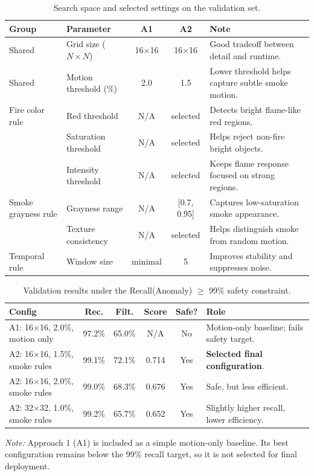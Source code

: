 \documentclass[10pt,a4paper]{article}
\begin{document}
	\begin{table}[ht]
		\centering
		\caption{Search space and selected settings on the validation set.}
		\label{tab:hyperparam_search}
		\scriptsize
		\setlength{\tabcolsep}{4pt}
		\begin{tabularx}{\columnwidth}{l l c c X}
			\toprule
			\textbf{Group} & \textbf{Parameter} & \textbf{A1} & \textbf{A2} & \textbf{Note} \\
			\midrule
			Shared & Grid size ($N \times N$) & 16$\times$16 & 16$\times$16 & Good tradeoff between detail and runtime. \\
			Shared & Motion threshold (\%) & 2.0 & 1.5 & Lower threshold helps capture subtle smoke motion. \\
			\midrule
			Fire color rule & Red threshold & N/A & selected & Detects bright flame-like red regions. \\
			& Saturation threshold & N/A & selected & Helps reject non-fire bright objects. \\
			& Intensity threshold & N/A & selected & Keeps flame response focused on strong regions. \\
			\midrule
			Smoke grayness rule & Grayness range & N/A & [0.7, 0.95] & Captures low-saturation smoke appearance. \\
			& Texture consistency & N/A & selected & Helps distinguish smoke from random motion. \\
			\midrule
			Temporal rule & Window size & minimal & 5 & Improves stability and suppresses noise. \\
			\bottomrule
		\end{tabularx}
	\end{table}


	\begin{table}[ht]
		\centering
		\caption{Validation results under the Recall(Anomaly) $\geq$ 99\% safety constraint.}
		\label{tab:val_selection}
		\scriptsize
		\setlength{\tabcolsep}{3pt}
		\begin{tabularx}{\columnwidth}{l c c c c X}
			\toprule
			\textbf{Config} & \textbf{Rec.} & \textbf{Filt.} & \textbf{Score} & \textbf{Safe?} & \textbf{Role} \\
			\midrule
			A1: 16$\times$16, 2.0\%, motion only & 97.2\% & 65.0\% & N/A & No & Motion-only baseline; fails safety target. \\
			A2: 16$\times$16, 1.5\%, smoke rules & 99.1\% & 72.1\% & 0.714 & Yes & \textbf{Selected final configuration}. \\
			A2: 16$\times$16, 2.0\%, smoke rules & 99.0\% & 68.3\% & 0.676 & Yes & Safe, but less efficient. \\
			A2: 32$\times$32, 1.0\%, smoke rules & 99.2\% & 65.7\% & 0.652 & Yes & Slightly higher recall, lower efficiency. \\
			\bottomrule
		\end{tabularx}
	\end{table}

	\vspace{2mm}
	\noindent\footnotesize\textit{Note:} Approach 1 (A1) is included as a simple motion-only baseline. Its best configuration remains below the 99\% recall target, so it is not selected for final deployment.
\end{document}
